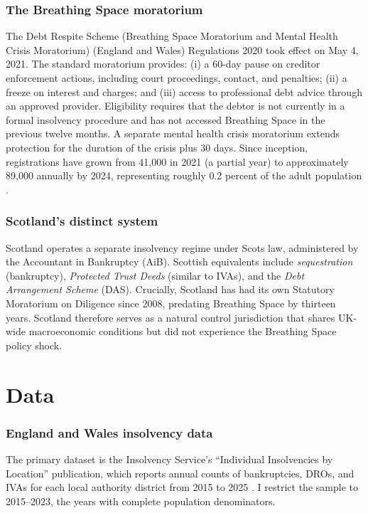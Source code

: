 \documentclass[12pt]{article}
\begin{document}
\subsubsection*{The Breathing Space moratorium} The Debt Respite Scheme (Breathing Space Moratorium and Mental Health Crisis Moratorium) (England and Wales) Regulations 2020 took effect on May 4, 2021. The standard moratorium provides: (i) a 60-day pause on creditor enforcement actions, including court proceedings, contact, and penalties; (ii) a freeze on interest and charges; and (iii) access to professional debt advice through an approved provider. Eligibility requires that the debtor is not currently in a formal insolvency procedure and has not accessed Breathing Space in the previous twelve months. A separate mental health crisis moratorium extends protection for the duration of the crisis plus 30 days. Since inception, registrations have grown from 41,000 in 2021 (a partial year) to approximately 89,000 annually by 2024, representing roughly 0.2 percent of the adult population \citep{insolvencyservice2024}.

\subsubsection*{Scotland's distinct system} Scotland operates a separate insolvency regime under Scots law, administered by the Accountant in Bankruptcy (AiB). Scottish equivalents include \textit{sequestration} (bankruptcy), \textit{Protected Trust Deeds} (similar to IVAs), and the \textit{Debt Arrangement Scheme} (DAS). Crucially, Scotland has had its own Statutory Moratorium on Diligence since 2008, predating Breathing Space by thirteen years. Scotland therefore serves as a natural control jurisdiction that shares UK-wide macroeconomic conditions but did not experience the Breathing Space policy shock.

\section{Data}

\subsubsection*{England and Wales insolvency data} The primary dataset is the Insolvency Service's ``Individual Insolvencies by Location'' publication, which reports annual counts of bankruptcies, DROs, and IVAs for each local authority district from 2015 to 2025 \citep{insolvencyservice2025}. I restrict the sample to 2015--2023, the years with complete population denominators.
\end{document}
